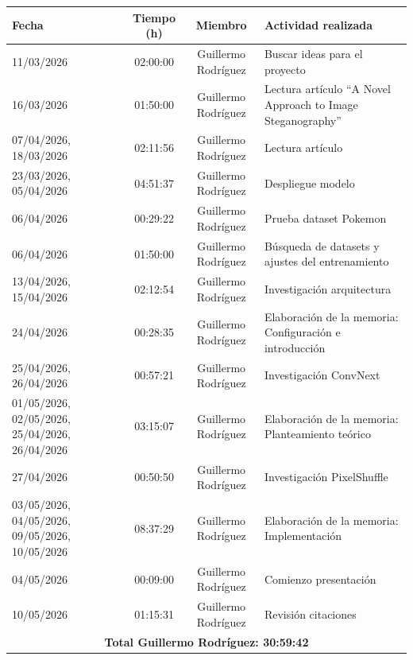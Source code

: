 \documentclass[a4paper]{article}
\begin{document}
\begin{center}
\begin{tabular}{|p{3.5cm}|c|c|p{6cm}|}
\hline
\textbf{Fecha} & \textbf{Tiempo (h)} & \textbf{Miembro} & \textbf{Actividad realizada} \\\hline
11/03/2026 & 02:00:00 & Guillermo Rodríguez & Buscar ideas para el proyecto \\\hline
16/03/2026 & 01:50:00 & Guillermo Rodríguez & Lectura artículo ``A Novel Approach to Image Steganography'' \\\hline
07/04/2026, 18/03/2026 & 02:11:56 & Guillermo Rodríguez & Lectura artículo \\\hline
23/03/2026, 05/04/2026 & 04:51:37 & Guillermo Rodríguez & Despliegue modelo \\\hline
06/04/2026 & 00:29:22 & Guillermo Rodríguez & Prueba dataset Pokemon \\\hline
06/04/2026 & 01:50:00 & Guillermo Rodríguez & Búsqueda de datasets y ajustes del entrenamiento \\\hline
13/04/2026, 15/04/2026 & 02:12:54 & Guillermo Rodríguez & Investigación arquitectura \\\hline
24/04/2026 & 00:28:35 & Guillermo Rodríguez & Elaboración de la memoria: Configuración e introducción \\\hline
25/04/2026, 26/04/2026 & 00:57:21 & Guillermo Rodríguez & Investigación ConvNext \\\hline
01/05/2026, 02/05/2026, 25/04/2026, 26/04/2026 & 03:15:07 & Guillermo Rodríguez & Elaboración de la memoria: Planteamiento teórico \\\hline
27/04/2026 & 00:50:50 & Guillermo Rodríguez & Investigación PixelShuffle \\\hline
03/05/2026, 04/05/2026, 09/05/2026, 10/05/2026 & 08:37:29 & Guillermo Rodríguez & Elaboración de la memoria: Implementación \\\hline
04/05/2026 & 00:09:00 & Guillermo Rodríguez & Comienzo presentación \\\hline
10/05/2026 & 01:15:31 & Guillermo Rodríguez & Revisión citaciones \\\hline
\multicolumn{4}{|c|}{\textbf{Total Guillermo Rodríguez: 30:59:42}} \\\hline
\end{tabular}
\end{center}

\bigskip
\end{document}
